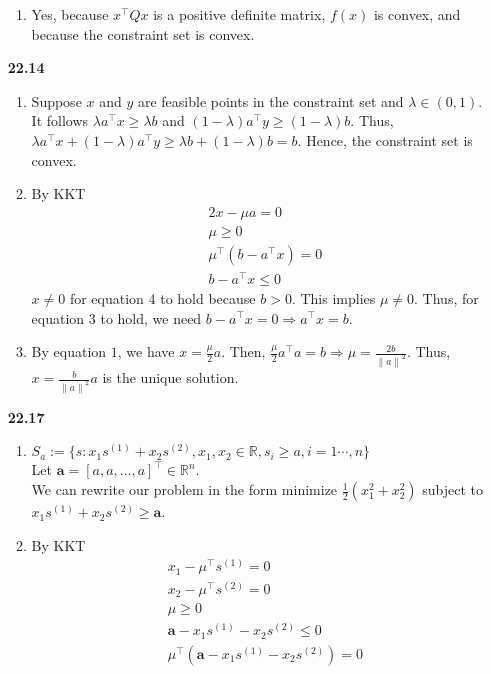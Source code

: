 \documentclass[10pt]{article}
\begin{document}
\begin{enumerate}
\begin{enumerate}
        \item Yes, because $x^\top Qx$ is a positive definite matrix, $f(x)$ is convex, and because the constraint set is convex. 
    \end{enumerate}
    \item [\textbf{22.14}] \begin{enumerate}
        \item Suppose $x$ and $y$ are feasible points in the constraint set and $\lambda\in(0,1)$. 
        It follows $\lambda a^\top x\ge \lambda b$ and $(1-\lambda)a^\top y\ge(1-\lambda)b$. 
        Thus, $\lambda a^\top x+(1-\lambda)a^\top y\ge \lambda b+(1-\lambda)b=b$.
        Hence, the constraint set is convex.
        \item By KKT \begin{align*}
            &2x-\mu a=0\\
            &\mu\ge 0\\
            &\mu^\top (b-a^\top x)=0\\
            &b-a^\top x\le 0
        \end{align*}
        $x\neq 0$ for equation $4$ to hold because $b>0$. This implies $\mu\neq 0$. Thus, for equation $3$ to hold, we need $b-a^\top x=0\Rightarrow a^\top x=b$.
        \item By equation $1$, we have $x=\frac{\mu}{2}a$. Then, $\frac{\mu}{2}a^\top a=b\Rightarrow \mu=\frac{2b}{{\lVert a\rVert}^2}$. Thus, $x=\frac{b}{{\lVert a\rVert}^2}a$ is the unique solution.
    \end{enumerate}
    \item [\textbf{22.17}]\begin{enumerate}
        \item $S_a:=\{s:x_1 s^{(1)}+x_2 s^{(2)},x_1,x_2\in\mathbb{R}, s_i\ge a,i=1\cdots,n\}$\\
        Let $\mathbf{a}={[a,a,\ldots, a]}^\top\in\mathbb{R}^n$.\\
        We can rewrite our problem in the form minimize $\frac{1}{2}(x_1^2+x_2^2)$ subject to $x_1 s^{(1)}+x_2 s^{(2)}\ge \mathbf{a}$.
        \item By KKT \begin{align*}
            &x_1-\mu^\top s^{(1)}=0\\
            &x_2-\mu^\top s^{(2)}=0\\
            &\mu\ge0\\
            &\mathbf{a}-x_1 s^{(1)}-x_2 s^{(2)}\le 0\\
            &\mu^\top(\mathbf{a}-x_1 s^{(1)}-x_2 s^{(2)})=0

\end{align*}
\end{enumerate}
\end{enumerate}
\end{document}
